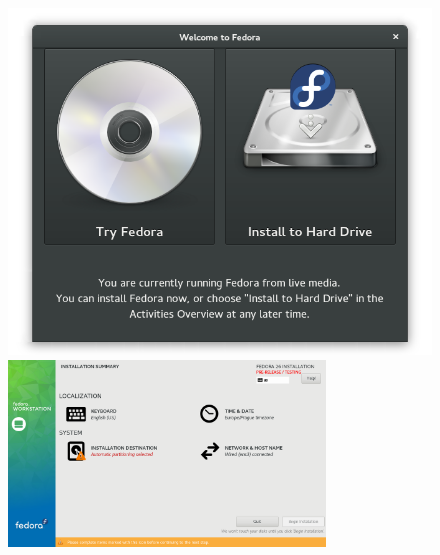 \begin{figure}[p]
\begin{center}
\includegraphics[width=.75\textwidth]{img/instalator-a}
 \label{fig:installer-a}
\bigskip
\includegraphics[width=0.75\textwidth]{img/installer-b}
 \label{fig:installer-b}
\end{center}
\end{figure}

